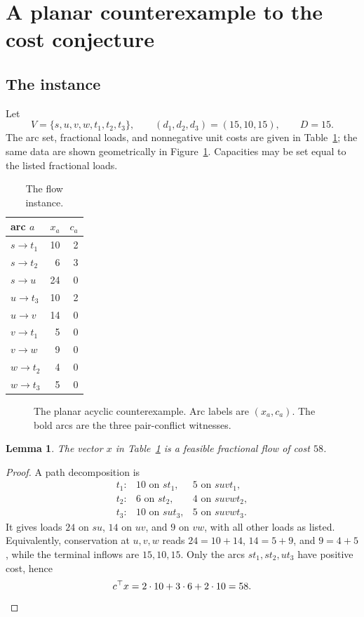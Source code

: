 \documentclass[11pt]{article}
\newtheorem{lemma}[theorem]{Lemma}
\theoremstyle{definition}
\begin{document}
\section{A planar counterexample to the cost conjecture}

\subsection{The instance}

Let
\[
 V=\{s,u,v,w,t_1,t_2,t_3\},
 \qquad
 (d_1,d_2,d_3)=(15,10,15),
 \qquad D=15.
\]
The arc set, fractional loads, and nonnegative unit costs are given in
Table~\ref{tab:arcs}; the same data are shown geometrically in
Figure~\ref{fig:network}.  Capacities may be set equal to the listed fractional
loads.

\begin{table}[ht]
\centering
\caption{The flow instance.}
\label{tab:arcs}
\begin{tabular}{@{}lrr@{}}
\toprule
arc $a$ & $x_a$ & $c_a$\\
\midrule
$s\to t_1$ & 10 & 2\\
$s\to t_2$ & 6 & 3\\
$s\to u$   & 24 & 0\\
$u\to t_3$ & 10 & 2\\
$u\to v$   & 14 & 0\\
$v\to t_1$ & 5 & 0\\
$v\to w$   & 9 & 0\\
$w\to t_2$ & 4 & 0\\
$w\to t_3$ & 5 & 0\\
\bottomrule
\end{tabular}
\end{table}

\begin{figure}[ht]
\centering

\caption{The planar acyclic counterexample.  Arc labels are $(x_a,c_a)$.
The bold arcs are the three pair-conflict witnesses.}
\label{fig:network}
\end{figure}

\begin{lemma}\label{lem:fractional}
The vector $x$ in Table~\ref{tab:arcs} is a feasible fractional flow of cost
$58$.
\end{lemma}
\begin{proof}
A path decomposition is
\[
\begin{array}{lll}
 t_1: &10\text{ on }s t_1,&5\text{ on }suvt_1,\\
 t_2: &6\text{ on }s t_2,&4\text{ on }suvwt_2,\\
 t_3: &10\text{ on }sut_3,&5\text{ on }suvwt_3.
\end{array}
\]
It gives loads $24$ on $su$, $14$ on $uv$, and $9$ on $vw$, with all other
loads as listed.  Equivalently, conservation at $u,v,w$ reads
$24=10+14$, $14=5+9$, and $9=4+5$, while the terminal inflows are
$15,10,15$.  Only the arcs $st_1,st_2,ut_3$ have positive cost, hence
\[
 c^\top x=2\cdot10+3\cdot6+2\cdot10=58.\qedhere
\]
\end{proof}
\end{document}
